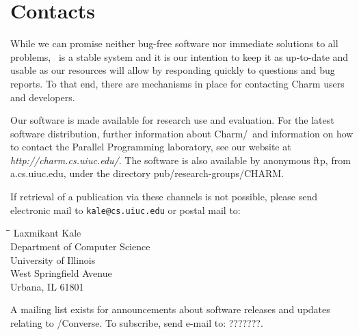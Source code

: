\section{Contacts}
\label{Distribution}

While we can promise neither bug-free software nor immediate solutions   
to all problems, \charmpp\ is a stable system and it is our intention to
keep it as up-to-date and usable as our resources will allow
by responding quickly to questions and bug reports.  To that
end, there are mechanisms in place for contacting Charm users
and developers. 

Our software is made available for research use and evaluation.
For the latest software distribution, further information about {\sc
Charm}/\charmpp\ and information on how to contact the Parallel
Programming laboratory, see our website at {\it
http://charm.cs.uiuc.edu/}.  The software is also available by
anonymous ftp, from a.cs.uiuc.edu, under the directory
pub/research-groups/CHARM.  

If retrieval of a publication via these channels is not possible,
please send electronic mail to {\tt kale@cs.uiuc.edu} or postal mail to:

{\bf 
\begin{tabbing}
\hspace{0.5in}\=\hspace{0.3in}\=\hspace{0.3in}\=\hspace{0.3in}\= \kill
\> Laxmikant Kale \\
\> Department of Computer Science \\
\> University of Illinois \\
 West Springfield Avenue \\
\> Urbana, IL 61801 \\
\end{tabbing}
}

A mailing list exists for announcements about software releases and
updates relating to \charmpp/{\sc Converse}.  To subscribe, send
e-mail to: ???????.
